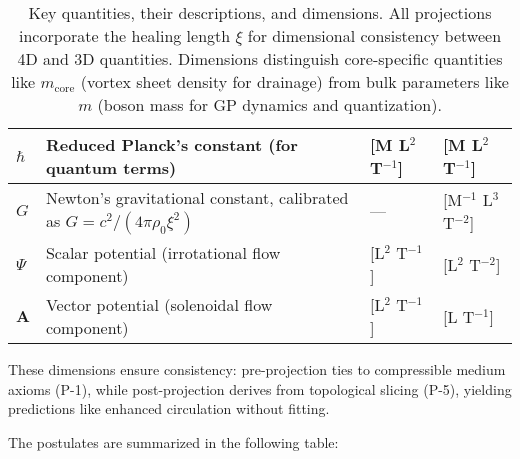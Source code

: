 \begin{table}[H]
\begin{tabular}{|l|l|l|l|}
\hline
$\hbar$ & Reduced Planck's constant (for quantum terms) & [M L$^2$ T$^{-1}$] & [M L$^2$ T$^{-1}$] \\
\hline
$G$ & Newton's gravitational constant, calibrated as $G = c^2 / (4\pi \rho_0 \xi^2)$ & --- & [M$^{-1}$ L$^3$ T$^{-2}$] \\
\hline
$\Psi$ & Scalar potential (irrotational flow component) & [L$^2$ T$^{-1}$] & [L$^2$ T$^{-2}$] \\
\hline
$\mathbf{A}$ & Vector potential (solenoidal flow component) & [L$^2$ T$^{-1}$] & [L T$^{-1}$] \\
\hline
\end{tabular}
\caption{Key quantities, their descriptions, and dimensions. All projections incorporate the healing length $\xi$ for dimensional consistency between 4D and 3D quantities. Dimensions distinguish core-specific quantities like $m_{\text{core}}$ (vortex sheet density for drainage) from bulk parameters like $m$ (boson mass for GP dynamics and quantization).\protect\footnotemark}
\label{tab:notation}
\end{table}

These dimensions ensure consistency: pre-projection ties to compressible medium axioms (P-1), while post-projection derives from topological slicing (P-5), yielding predictions like enhanced circulation without fitting.

The postulates are summarized in the following table:

